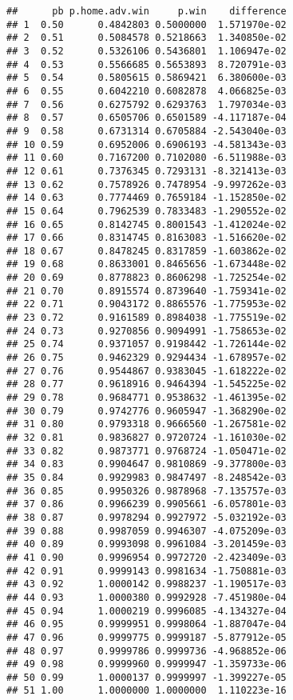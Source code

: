 \documentclass[
]{article}
\begin{document}
\begin{verbatim}
##      pb p.home.adv.win     p.win    difference
## 1  0.50      0.4842803 0.5000000  1.571970e-02
## 2  0.51      0.5084578 0.5218663  1.340850e-02
## 3  0.52      0.5326106 0.5436801  1.106947e-02
## 4  0.53      0.5566685 0.5653893  8.720791e-03
## 5  0.54      0.5805615 0.5869421  6.380600e-03
## 6  0.55      0.6042210 0.6082878  4.066825e-03
## 7  0.56      0.6275792 0.6293763  1.797034e-03
## 8  0.57      0.6505706 0.6501589 -4.117187e-04
## 9  0.58      0.6731314 0.6705884 -2.543040e-03
## 10 0.59      0.6952006 0.6906193 -4.581343e-03
## 11 0.60      0.7167200 0.7102080 -6.511988e-03
## 12 0.61      0.7376345 0.7293131 -8.321413e-03
## 13 0.62      0.7578926 0.7478954 -9.997262e-03
## 14 0.63      0.7774469 0.7659184 -1.152850e-02
## 15 0.64      0.7962539 0.7833483 -1.290552e-02
## 16 0.65      0.8142745 0.8001543 -1.412024e-02
## 17 0.66      0.8314745 0.8163083 -1.516620e-02
## 18 0.67      0.8478245 0.8317859 -1.603862e-02
## 19 0.68      0.8633001 0.8465656 -1.673448e-02
## 20 0.69      0.8778823 0.8606298 -1.725254e-02
## 21 0.70      0.8915574 0.8739640 -1.759341e-02
## 22 0.71      0.9043172 0.8865576 -1.775953e-02
## 23 0.72      0.9161589 0.8984038 -1.775519e-02
## 24 0.73      0.9270856 0.9094991 -1.758653e-02
## 25 0.74      0.9371057 0.9198442 -1.726144e-02
## 26 0.75      0.9462329 0.9294434 -1.678957e-02
## 27 0.76      0.9544867 0.9383045 -1.618222e-02
## 28 0.77      0.9618916 0.9464394 -1.545225e-02
## 29 0.78      0.9684771 0.9538632 -1.461395e-02
## 30 0.79      0.9742776 0.9605947 -1.368290e-02
## 31 0.80      0.9793318 0.9666560 -1.267581e-02
## 32 0.81      0.9836827 0.9720724 -1.161030e-02
## 33 0.82      0.9873771 0.9768724 -1.050471e-02
## 34 0.83      0.9904647 0.9810869 -9.377800e-03
## 35 0.84      0.9929983 0.9847497 -8.248542e-03
## 36 0.85      0.9950326 0.9878968 -7.135757e-03
## 37 0.86      0.9966239 0.9905661 -6.057801e-03
## 38 0.87      0.9978294 0.9927972 -5.032192e-03
## 39 0.88      0.9987059 0.9946307 -4.075209e-03
## 40 0.89      0.9993098 0.9961084 -3.201459e-03
## 41 0.90      0.9996954 0.9972720 -2.423409e-03
## 42 0.91      0.9999143 0.9981634 -1.750881e-03
## 43 0.92      1.0000142 0.9988237 -1.190517e-03
## 44 0.93      1.0000380 0.9992928 -7.451980e-04
## 45 0.94      1.0000219 0.9996085 -4.134327e-04
## 46 0.95      0.9999951 0.9998064 -1.887047e-04
## 47 0.96      0.9999775 0.9999187 -5.877912e-05
## 48 0.97      0.9999786 0.9999736 -4.968852e-06
## 49 0.98      0.9999960 0.9999947 -1.359733e-06
## 50 0.99      1.0000137 0.9999997 -1.399227e-05
## 51 1.00      1.0000000 1.0000000  1.110223e-16
\end{verbatim}
\end{document}
